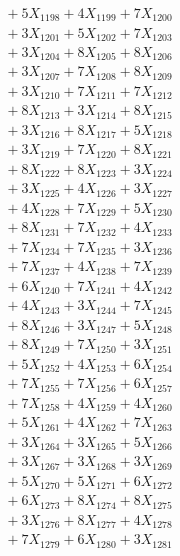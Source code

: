 \documentclass[a4paper,10pt]{article}
\begin{document}
{\begin{align}
&\;  + 5 X_{1198} + 4 X_{1199} + 7 X_{1200} \\[0.3ex]
&\;  + 3 X_{1201} + 5 X_{1202} + 7 X_{1203} \\[0.3ex]
&\;  + 3 X_{1204} + 8 X_{1205} + 8 X_{1206} \\[0.3ex]
&\;  + 3 X_{1207} + 7 X_{1208} + 8 X_{1209} \\[0.5ex]\allowbreak
&\;  + 3 X_{1210} + 7 X_{1211} + 7 X_{1212} \\[0.3ex]
&\;  + 8 X_{1213} + 3 X_{1214} + 8 X_{1215} \\[0.3ex]
&\;  + 3 X_{1216} + 8 X_{1217} + 5 X_{1218} \\[0.3ex]
&\;  + 3 X_{1219} + 7 X_{1220} + 8 X_{1221} \\[0.3ex]
&\;  + 8 X_{1222} + 8 X_{1223} + 3 X_{1224} \\[0.3ex]
&\;  + 3 X_{1225} + 4 X_{1226} + 3 X_{1227} \\[0.3ex]
&\;  + 4 X_{1228} + 7 X_{1229} + 5 X_{1230} \\[0.3ex]
&\;  + 8 X_{1231} + 7 X_{1232} + 4 X_{1233} \\[0.3ex]
&\;  + 7 X_{1234} + 7 X_{1235} + 3 X_{1236} \\[0.3ex]
&\;  + 7 X_{1237} + 4 X_{1238} + 7 X_{1239} \\[0.5ex]\allowbreak
&\;  + 6 X_{1240} + 7 X_{1241} + 4 X_{1242} \\[0.3ex]
&\;  + 4 X_{1243} + 3 X_{1244} + 7 X_{1245} \\[0.3ex]
&\;  + 8 X_{1246} + 3 X_{1247} + 5 X_{1248} \\[0.3ex]
&\;  + 8 X_{1249} + 7 X_{1250} + 3 X_{1251} \\[0.3ex]
&\;  + 5 X_{1252} + 4 X_{1253} + 6 X_{1254} \\[0.3ex]
&\;  + 7 X_{1255} + 7 X_{1256} + 6 X_{1257} \\[0.3ex]
&\;  + 7 X_{1258} + 4 X_{1259} + 4 X_{1260} \\[0.3ex]
&\;  + 5 X_{1261} + 4 X_{1262} + 7 X_{1263} \\[0.3ex]
&\;  + 3 X_{1264} + 3 X_{1265} + 5 X_{1266} \\[0.3ex]
&\;  + 3 X_{1267} + 3 X_{1268} + 3 X_{1269} \\[0.5ex]\allowbreak
&\;  + 5 X_{1270} + 5 X_{1271} + 6 X_{1272} \\[0.3ex]
&\;  + 6 X_{1273} + 8 X_{1274} + 8 X_{1275} \\[0.3ex]
&\;  + 3 X_{1276} + 8 X_{1277} + 4 X_{1278} \\[0.3ex]
&\;  + 7 X_{1279} + 6 X_{1280} + 3 X_{1281} \\[0.3ex]

\end{align}}
\end{document}
